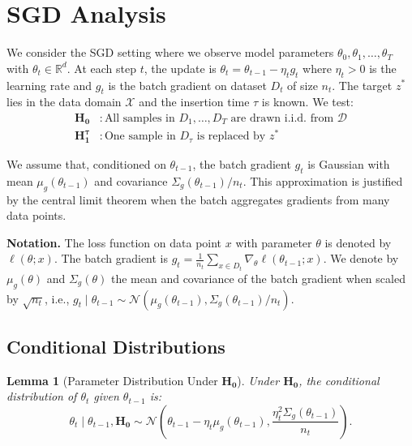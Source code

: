 \documentclass{article}
\theoremstyle{plain}
\newtheorem{lemma}[theorem]{Lemma}
\theoremstyle{definition}
\theoremstyle{remark}
\newcommand{\RR}{\ensuremath{\mathbb{R}}}
\newcommand{\cX}{\ensuremath{\mathcal{X}}}
\newcommand{\cN}{\ensuremath{\mathcal{N}}}
\newcommand{\cD}{\ensuremath{\mathcal{D}}}
\begin{document}
\section{SGD Analysis}
\label{app:sgd}

We consider the SGD setting where we observe model parameters $\theta_0, \theta_1, \ldots, \theta_T$ with $\theta_t \in \RR^d$. At each step $t$, the update is $\theta_t = \theta_{t-1} - \eta_t g_t$ where $\eta_t > 0$ is the learning rate and $g_t$ is the batch gradient on dataset $D_t$ of size $n_t$. The target $z^*$ lies in the data domain $\cX$ and the insertion time $\tau$ is known. We test:
\begin{align*}
    \mathbf{H_0}      & : \text{All samples in } D_1, \ldots, D_T \text{ are drawn i.i.d.\ from } \cD \\
    \mathbf{H_1^\tau} & : \text{One sample in } D_\tau \text{ is replaced by } z^*
\end{align*}

We assume that, conditioned on $\theta_{t-1}$, the batch gradient $g_t$ is Gaussian with mean $\mu_g(\theta_{t-1})$ and covariance $\Sigma_g(\theta_{t-1})/n_t$. This approximation is justified by the central limit theorem when the batch aggregates gradients from many data points.

\textbf{Notation.} The loss function on data point $x$ with parameter $\theta$ is denoted by $\ell(\theta; x)$. The batch gradient is $g_t = \frac{1}{n_t}\sum_{x \in D_t} \nabla_\theta \ell(\theta_{t-1}; x)$. We denote by $\mu_g(\theta)$ and $\Sigma_g(\theta)$ the mean and covariance of the batch gradient when scaled by $\sqrt{n_t}$, i.e., $g_t \mid \theta_{t-1} \sim \cN(\mu_g(\theta_{t-1}), \Sigma_g(\theta_{t-1})/n_t)$.

\subsection{Conditional Distributions}

\begin{lemma}[Parameter Distribution Under $\mathbf{H_0}$]
    \label{lem:sgd-h0}
    Under $\mathbf{H_0}$, the conditional distribution of $\theta_t$ given $\theta_{t-1}$ is:
    \begin{equation*}
        \theta_t \mid \theta_{t-1}, \mathbf{H_0} \sim \cN\left(\theta_{t-1} - \eta_t \mu_g(\theta_{t-1}), \frac{\eta_t^2 \Sigma_g(\theta_{t-1})}{n_t}\right).
    \end{equation*}
\end{lemma}
\end{document}
